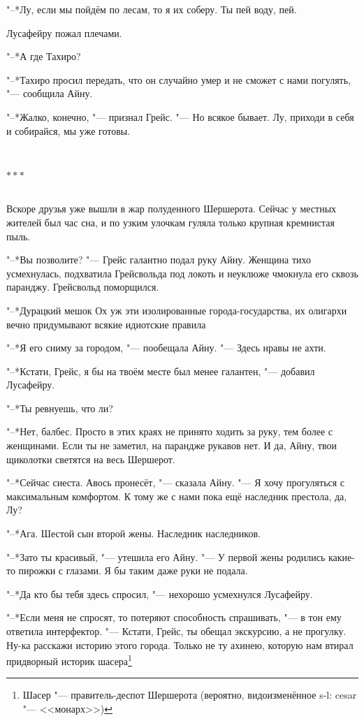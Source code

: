\documentclass[a4paper,10pt]{book}
\newcommand{\ldotst}{\so{...}\xspace}
\newcommand{\razd}{~\\{\centering\Large\bfseries$\ast \ast \ast$\par}~\\}
\begin{document}
"--*Лу, если мы пойдём по лесам, то я их соберу. Ты пей воду, пей.

Лусафейру пожал плечами.

"--*А где Тахиро?

"--*Тахиро просил передать, что он случайно умер и не сможет с нами погулять, 
"--- сообщила Айну.

"--*Жалко, конечно, "--- признал Грейс. "--- Но всякое бывает. Лу, приходи в 
себя и собирайся, мы уже готовы.

\razd

Вскоре друзья уже вышли в жар полуденного Шершерота. Сейчас у местных жителей 
был час сна, и по узким улочкам гуляла только крупная кремнистая пыль.

"--*Вы позволите? "--- Грейс галантно подал руку Айну. Женщина тихо 
усмехнулась, подхватила Грейсвольда под локоть и неуклюже чмокнула его сквозь 
паранджу. Грейсвольд поморщился.

"--*Дурацкий мешок\ldotst Ох уж эти изолированные города-государства, их 
олигархи вечно придумывают всякие идиотские правила\ldotst

"--*Я его сниму за городом, "--- пообещала Айну. "--- Здесь нравы не ахти.

"--*Кстати, Грейс, я бы на твоём месте был менее галантен, "--- добавил 
Лусафейру.

"--*Ты ревнуешь, что ли?

"--*Нет, балбес. Просто в этих краях не принято ходить за руку, тем более с 
женщинами. Если ты не заметил, на парандже рукавов нет. И да, Айну, твои 
щиколотки светятся на весь Шершерот.

"--*Сейчас сиеста. Авось пронесёт, "--- сказала Айну. "--- Я хочу прогуляться с 
максимальным комфортом. К тому же с нами пока ещё наследник престола, да, Лу?

"--*Ага. Шестой сын второй жены. Наследник наследников.

"--*Зато ты красивый, "--- утешила его Айну. "--- У первой жены родились 
какие-то пирожки с глазами. Я бы таким даже руки не подала.

"--*Да кто бы тебя здесь спросил, "--- нехорошо усмехнулся Лусафейру.

"--*Если меня не спросят, то потеряют способность спрашивать, "--- в тон ему 
ответила интерфектор. "--- Кстати, Грейс, ты обещал экскурсию, а не прогулку. 
Ну-ка расскажи историю этого города. Только не ту ахинею, которую нам втирал 
придворный историк шасера\footnote{Шасер "--- правитель-деспот Шершерота 
(вероятно, видоизменённое s-l: cesar "--- <<монарх>>)}\ldotst
\end{document}
